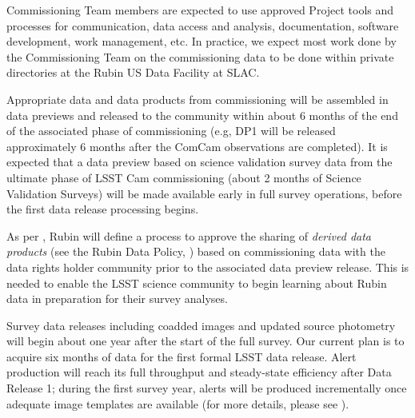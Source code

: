 Commissioning Team members are expected to use approved Project tools and processes for communication, data access and analysis, documentation, \gls{software} development, work management, etc.
In practice, we expect most work done by the \gls{Commissioning} Team on the commissioning data to be done within private directories at the Rubin US Data Facility at SLAC.

Appropriate data and data products from commissioning will be assembled in data previews  and released to the community within about 6 months of the end of the associated phase of commissioning (e.g, DP1 will be released approximately 6 months after the \gls{ComCam} observations are completed).
It is expected that a data preview based on science validation survey data from the ultimate phase of LSST Cam commissioning (about 2 months of Science \gls{Validation} Surveys) will be made available early in full survey operations, before the first data release processing begins.

As per , Rubin will define a process to approve the sharing of {\it derived data products} (see the Rubin Data Policy, ) based on commissioning data with the data rights holder community prior to the associated data preview release.
This is needed to enable the \gls{LSST} science community to begin learning about Rubin data in preparation for their survey analyses.

Survey data releases including coadded images and updated source photometry will begin about one year after the start of the full survey.
Our current plan is to acquire six months of data for the first formal \gls{LSST} data release.
Alert production will reach its full throughput and steady-state efficiency after \gls{Data Release} 1; during the first survey year, alerts will be produced incrementally once adequate image templates are available (for more details, please see ).
